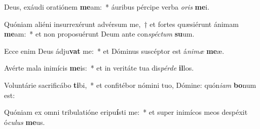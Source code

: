 \item Deus, exáudi oratiónem \textbf{me}am:~* áuribus pércipe verba \textit{oris} \textbf{me}i.
\item Quóniam aliéni insurrexérunt advérsum me,~† et fortes quæsiérunt ánimam \textbf{me}am:~* et non proposuérunt Deum ante con\spurhspace\textit{spéctum} \textbf{su}um.
\item Ecce enim Deus ádju\textbf{vat} me:~* et Dóminus suscéptor est á\tinyhspace\textit{nimæ} \textbf{me}æ.
\item Avérte mala inimícis \textbf{me}is:~* et in veritáte tua dis\tinyhspace\textit{pérde} \textbf{il}los.
\item Voluntárie sacrificábo \textbf{ti}bi,~* et confitébor nómini tuo, Dómine: quón\textit{iam} \textbf{bo}num est:
\item Quóniam ex omni tribulatióne eripu\textbf{í}sti me:~* et super inimícos meos despéxit ó\tinyhspace\textit{culus} \textbf{me}us.
